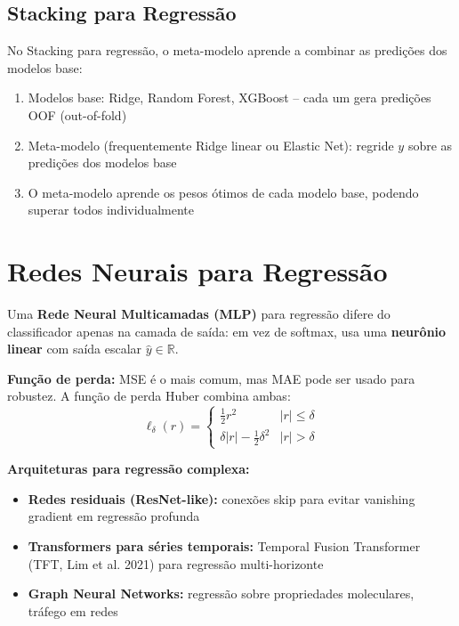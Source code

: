 \documentclass[12pt,a4paper]{article}
\begin{document}
\subsection{Stacking para Regressão}

No Stacking para regressão, o meta-modelo aprende a combinar as predições dos modelos base:

\begin{enumerate}
  \item Modelos base: Ridge, Random Forest, XGBoost -- cada um gera predições OOF (out-of-fold)
  \item Meta-modelo (frequentemente Ridge linear ou Elastic Net): regride $y$ sobre as predições dos modelos base
  \item O meta-modelo aprende os pesos ótimos de cada modelo base, podendo superar todos individualmente
\end{enumerate}

\section{Redes Neurais para Regressão}

Uma \textbf{Rede Neural Multicamadas (MLP)} para regressão difere do classificador apenas na camada de saída: em vez de softmax, usa uma \textbf{neurônio linear} com saída escalar $\hat{y} \in \mathbb{R}$.

\textbf{Função de perda:} MSE é o mais comum, mas MAE pode ser usado para robustez. A função de perda Huber combina ambas:
\[
  \ell_\delta(r) = \begin{cases} \frac{1}{2}r^2 & |r| \leq \delta \\ \delta|r| - \frac{1}{2}\delta^2 & |r| > \delta \end{cases}
\]

\textbf{Arquiteturas para regressão complexa:}
\begin{itemize}
  \item \textbf{Redes residuais (ResNet-like):} conexões skip para evitar vanishing gradient em regressão profunda
  \item \textbf{Transformers para séries temporais:} Temporal Fusion Transformer (TFT, Lim et al. 2021) para regressão multi-horizonte
  \item \textbf{Graph Neural Networks:} regressão sobre propriedades moleculares, tráfego em redes
\end{itemize}
\end{document}
